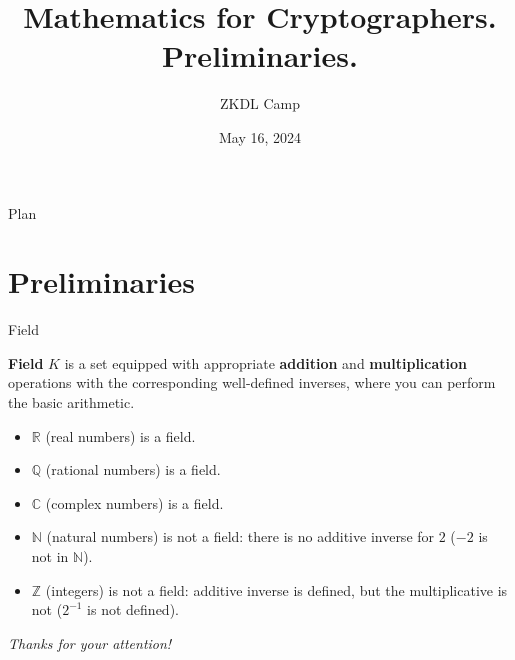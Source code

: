 \documentclass{beamer}
\title[Elliptic Curves]{\textbf{Mathematics for Cryptographers. Preliminaries.}}
\author{ZKDL Camp\vspace{-2em}}
\date{May 16, 2024}
\begin{document}
	\frame {
		\titlepage
	}
 
	\begin{frame}{Plan}
        \tableofcontents
    \end{frame}

	\section{Preliminaries}
    \begin{frame}{Field}
        \begin{definition}{}
            \textbf{Field} $K$ is a set equipped with appropriate \textbf{addition} and \textbf{multiplication} operations with the corresponding well-defined inverses, where you can perform the basic arithmetic.
        \end{definition}
        \pause
        \begin{exampleblock}{}
            \begin{itemize}
                \item $\mathbb{R}$ (real numbers) is a field.
                \item $\mathbb{Q}$ (rational numbers) is a field.
                \item $\mathbb{C}$ (complex numbers) is a field.
                \item $\mathbb{N}$ (natural numbers) is not a field: there is no additive inverse for $2$ ($-2$ is not in $\mathbb{N}$).
                \item $\mathbb{Z}$ (integers) is not a field: additive inverse is defined, but the multiplicative is not ($2^{-1}$ is not defined).
            \end{itemize}
        \end{exampleblock}
    \end{frame}
 
	\begin{frame}{}
      \centering \Large
      \emph{Thanks for your attention!}
    \end{frame}
\end{document}
